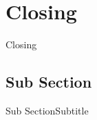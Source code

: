 \section{Closing}
\begin{frame}{Closing}

\end{frame}

\subsection{Sub Section}
\begin{frame}{Sub Section}{Subtitle}

\end{frame}